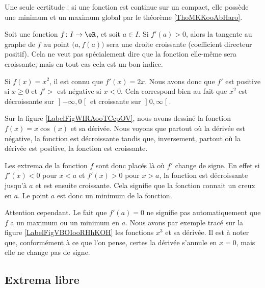 Une seule certitude : si une fonction est continue sur un compact, elle possède une minimum et un maximum global par le théorème \ref{ThoMKKooAbHaro}.

Soit une fonction $f\colon I\to \eR$, et soit $a\in I$. Si $f'(a)>0$, alors la tangente au graphe de $f$ au point $\big( a,f(a) \big)$ sera une droite croissante (coefficient directeur positif). Cela ne veut pas spécialement dire que la fonction elle-même sera croissante, mais en tout cas cela est un bon indice.

\begin{example}
	Si $f(x)=x^2$, il est connu que $f'(x)=2x$. Nous avons donc que $f'$ est positive si $x\geq 0$ et $f'>$ est négative si $x<0$. Cela correspond bien au fait que $x^2$ est décroissante sur $\mathopen] -\infty , 0 \mathclose[$ et croissante sur $\mathopen] 0 , \infty \mathclose[$.
\end{example}
 
Sur la figure \ref{LabelFigWIRAooTCcpOV}, nous avons dessiné la fonction $f(x)=x\cos(x)$ et sa dérivée. Nous voyons que partout où la dérivée est négative, la fonction est décroissante tandis que, inversement, partout où la dérivée est positive, la fonction est croissante.
\newcommand{\CaptionFigWIRAooTCcpOV}{La fonction $f(x)=x\cos(x)$ en bleu et sa dérivée en rouge.}


Les extrema de la fonction $f$ sont donc placés là où $f'$ change de signe. En effet si $f'(x)<0$ pour $x<a$ et $f'(x)>0$ pour $x>a$, la fonction est décroissante jusqu'à $a$ et est ensuite croissante. Cela signifie que la fonction connait un creux en $a$. Le point $a$ est donc un minimum de la fonction.

Attention cependant. Le fait que $f'(a)=0$ ne signifie pas automatiquement que $f$ a un maximum ou un minimum en $a$. Nous avons par exemple tracé sur la figure \ref{LabelFigVBOIooRHhKOH} les fonctions $x^3$ et sa dérivée. Il est à noter que, conformément à ce que l'on pense, certes la dérivée s'annule en $x=0$, mais elle ne change pas de signe.

\newcommand{\CaptionFigVBOIooRHhKOH}{La dérivée de $x^3$ s'annule en $x=0$, mais ce n'est ni un minimum ni un maximum.}

 
\subsection{Extrema libre}

